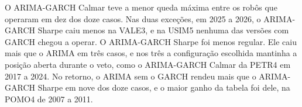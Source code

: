 O ARIMA-GARCH Calmar teve a menor queda máxima entre os robôs que operaram em dez
dos doze casos. Nas duas exceções, em 2025 a 2026, o ARIMA-GARCH
Sharpe caiu menos na VALE3, e na USIM5 nenhuma das versões com GARCH chegou a
operar. O ARIMA-GARCH Sharpe foi menos regular. Ele caiu mais que o ARIMA em três
casos, e nos três a configuração escolhida mantinha a posição aberta durante o
veto, como o ARIMA-GARCH Calmar da PETR4 em 2017 a 2024. No retorno, o ARIMA sem o GARCH rendeu mais que o
ARIMA-GARCH Sharpe em nove dos doze casos, e o maior ganho da tabela foi dele, na
POMO4 de 2007 a 2011.


